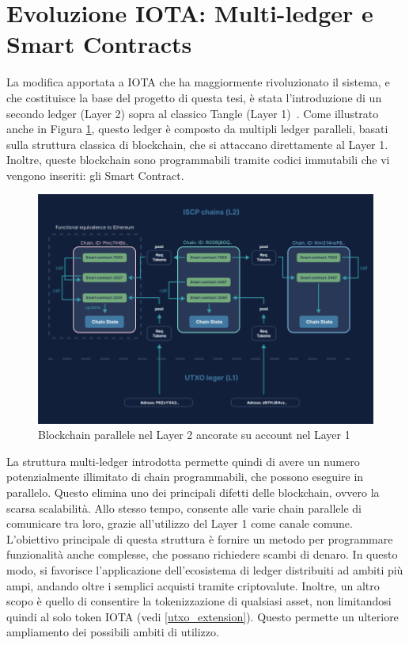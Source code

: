 \documentclass[12pt,a4paper,openright,twoside]{report}
\begin{document}
\section{Evoluzione IOTA: Multi-ledger e Smart Contracts}
La modifica apportata a IOTA che ha maggiormente rivoluzionato il sistema, e che costituisce la base del progetto di questa tesi, è stata l'introduzione di un secondo ledger (Layer 2) sopra al classico Tangle (Layer 1)~\cite{smartcontracts}. Come illustrato anche in Figura \ref{fig:l2_structure}, questo ledger è composto da multipli ledger paralleli, basati sulla struttura classica di blockchain, che si attaccano direttamente al Layer 1. Inoltre, queste blockchain sono programmabili tramite codici immutabili che vi vengono inseriti: gli Smart Contract.

\begin{figure}[h]
\begin{center}
\includegraphics[width=\textwidth]{figures/l2_structure.png}
\caption[IOTA Layer 2]{Blockchain parallele nel Layer 2 ancorate su account nel Layer 1\footnotemark}\label{fig:l2_structure}
\end{center}
\end{figure}
La struttura multi-ledger introdotta permette quindi di avere un numero potenzialmente illimitato di chain programmabili, che possono eseguire in parallelo. Questo elimina uno dei principali difetti delle blockchain, ovvero la scarsa scalabilità. Allo stesso tempo, consente alle varie chain parallele di comunicare tra loro, grazie all'utilizzo del Layer 1 come canale comune.\\
L'obiettivo principale di questa struttura è fornire un metodo per programmare funzionalità anche complesse, che possano richiedere scambi di denaro. In questo modo, si favorisce l'applicazione dell'ecosistema di ledger distribuiti ad ambiti più ampi, andando oltre i semplici acquisti tramite criptovalute. Inoltre, un altro scopo è quello di consentire la tokenizzazione di qualsiasi asset, non limitandosi quindi al solo token IOTA (vedi \ref{utxo_extension}). Questo permette un ulteriore ampliamento dei possibili ambiti di utilizzo.
\end{document}
